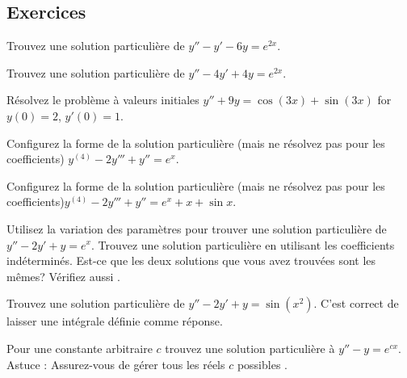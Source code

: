 \subsection{Exercices}

\begin{exercise}
Trouvez une solution particulière de
$y''-y' -6y = e^{2x}$.
\end{exercise}

\begin{exercise}
Trouvez une solution particulière de
$y''-4y' +4y = e^{2x}$.
\end{exercise}

\begin{exercise}
Résolvez le problème à valeurs initiales
$y''+9y = \cos (3x) + \sin (3x)$ for $y(0) = 2$, $y'(0) = 1$.
\end{exercise}

\begin{exercise}

Configurez la forme de la solution particulière (mais ne résolvez pas 
pour les coefficients)  $y^{(4)}-2y'''+y'' = e^x$.
\end{exercise}

\begin{exercise}
Configurez la forme de la solution particulière (mais ne résolvez pas 
pour les coefficients)$y^{(4)}-2y'''+y'' = e^x + x + \sin x$.
\end{exercise}

\begin{exercise}
\pagebreak[2]
\leavevmode
\begin{tasks}
\task Utilisez la variation des paramètres pour trouver une solution particulière de 
$y''-2y'+y = e^x$.
\task Trouvez une solution particulière en utilisant les coefficients indéterminés. 
\task Est-ce que les deux solutions que vous avez trouvées sont les mêmes?
Vérifiez aussi .
\end{tasks}
\end{exercise}

\begin{exercise}
Trouvez une solution particulière de
$y''-2y' +y = \sin (x^2)$.  C'est correct de laisser une intégrale définie comme réponse. 
\end{exercise}

\begin{exercise}
Pour une constante arbitraire $c$ trouvez une solution particulière à $y''-y=e^{cx}$. Astuce : Assurez-vous de gérer tous les réels $c$ possibles .
\end{exercise}

